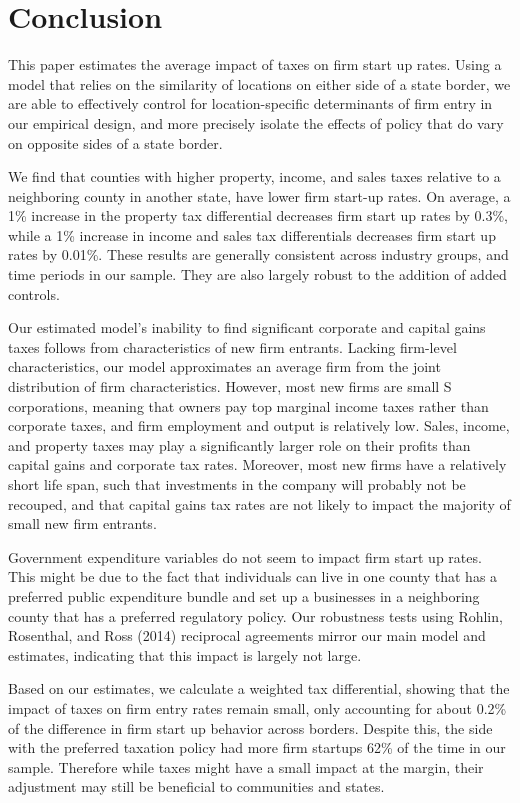 \section{Conclusion}

This paper estimates the average impact of taxes on firm start up rates. Using a model that relies on the similarity of locations on either side of a state border, we are able to effectively control for location-specific determinants of firm entry in our empirical design, and more precisely isolate the effects of policy  that do vary on opposite sides of a state border. 

We find that counties with higher property, income, and sales taxes relative to a neighboring county in another state, have lower firm start-up rates. On average, a 1\% increase in the property tax differential decreases firm start up rates by 0.3\%, while a 1\% increase in income and sales tax differentials decreases firm start up rates by 0.01\%.   These results are generally consistent across industry groups, and time periods in our sample.  They are also largely robust to the addition of added controls.

Our estimated model's inability to find significant corporate and capital gains taxes follows from characteristics of new firm entrants. Lacking firm-level characteristics, our model approximates an average firm from the joint distribution of firm characteristics. However, most new firms are small S corporations, meaning that owners pay top marginal income taxes rather than corporate taxes, and firm employment and output is relatively low. Sales, income, and property taxes may play a significantly larger role on their profits than capital gains and corporate tax rates. Moreover, most new firms have a relatively short life span, such that investments in the company will probably not be recouped, and that capital gains tax rates are not likely to impact the majority of small new firm entrants.

Government expenditure variables do not seem to impact firm start up rates. This might be due to the fact that individuals can live in one county that has a preferred public expenditure bundle and set up a businesses in a neighboring county that has a preferred regulatory policy. Our robustness tests using Rohlin, Rosenthal, and Ross (2014) reciprocal agreements mirror our main model and estimates, indicating that this impact is largely not large.

Based on our estimates, we calculate a weighted tax differential, showing that the impact of taxes on firm entry rates remain small, only accounting for about 0.2\% of the difference in firm start up behavior across borders. Despite this, the side with the preferred taxation policy had more firm startups 62\% of the time in our sample. Therefore while taxes might have a small impact at the margin, their adjustment may still be beneficial to communities and states. 

